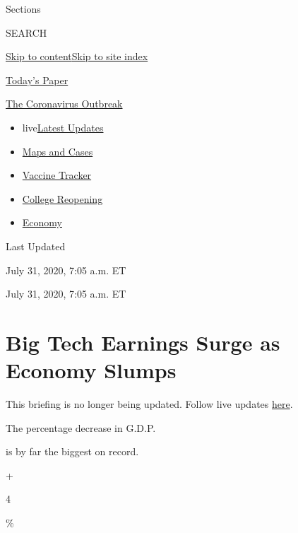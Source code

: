Sections

SEARCH

\protect\hyperlink{site-content}{Skip to
content}\protect\hyperlink{site-index}{Skip to site index}

\href{https://myaccount.nytimes3xbfgragh.onion/auth/login?response_type=cookie\&client_id=vi}{}

\href{https://www.nytimes3xbfgragh.onion/section/todayspaper}{Today's
Paper}

\href{https://www.nytimes3xbfgragh.onion/news-event/coronavirus}{The
Coronavirus Outbreak}

\begin{itemize}
\tightlist
\item
  live\href{https://www.nytimes3xbfgragh.onion/2020/08/04/world/coronavirus-cases.html}{Latest
  Updates}
\item
  \href{https://www.nytimes3xbfgragh.onion/interactive/2020/us/coronavirus-us-cases.html}{Maps
  and Cases}
\item
  \href{https://www.nytimes3xbfgragh.onion/interactive/2020/science/coronavirus-vaccine-tracker.html}{Vaccine
  Tracker}
\item
  \href{https://www.nytimes3xbfgragh.onion/2020/08/02/us/covid-college-reopening.html}{College
  Reopening}
\item
  \href{https://www.nytimes3xbfgragh.onion/live/2020/08/04/business/stock-market-today-coronavirus}{Economy}
\end{itemize}

Last Updated

July 31, 2020, 7:05 a.m. ET

July 31, 2020, 7:05 a.m. ET

\hypertarget{big-tech-earnings-surge-as-economy-slumps}{%
\section{Big Tech Earnings Surge as Economy
Slumps}\label{big-tech-earnings-surge-as-economy-slumps}}

This briefing is no longer being updated. Follow live updates
\href{https://www.nytimes3xbfgragh.onion/live/2020/07/31/business/stock-market-today-coronavirus}{here}.

The percentage decrease in G.D.P.

is by far the biggest on record.

+

4

\%

